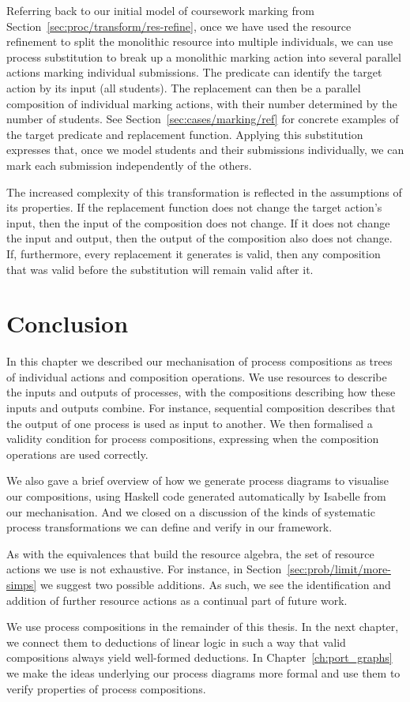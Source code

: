 \documentclass[class=smolathesis,crop=false]{standalone}
\begin{document}
Referring back to our initial model of coursework marking from Section~\ref{sec:proc/transform/res-refine}, once we have used the resource refinement to split the monolithic  resource into multiple individuals, we can use process substitution to break up a monolithic marking action into several parallel actions marking individual submissions.
The predicate can identify the target action by its input (all students).
The replacement can then be a parallel composition of individual marking actions, with their number determined by the number of students.
See Section~\ref{sec:cases/marking/ref} for concrete examples of the target predicate and replacement function.
Applying this substitution expresses that, once we model students and their submissions individually, we can mark each submission independently of the others.

The increased complexity of this transformation is reflected in the assumptions of its properties.
If the replacement function does not change the target action's input, then the input of the composition does not change.
If it does not change the input and output, then the output of the composition also does not change.
If, furthermore, every replacement it generates is valid, then any composition that was valid before the substitution will remain valid after it.

\section{Conclusion}
\label{sec:proc/conc}

In this chapter we described our mechanisation of process compositions as trees of individual actions and composition operations.
We use resources to describe the inputs and outputs of processes, with the compositions describing how these inputs and outputs combine.
For instance, sequential composition describes that the output of one process is used as input to another.
We then formalised a validity condition for process compositions, expressing when the composition operations are used correctly.

We also gave a brief overview of how we generate process diagrams to visualise our compositions, using Haskell code generated automatically by Isabelle from our mechanisation.
And we closed on a discussion of the kinds of systematic process transformations we can define and verify in our framework.

As with the equivalences that build the resource algebra, the set of resource actions we use is not exhaustive.
For instance, in Section~\ref{sec:prob/limit/more-simps} we suggest two possible additions.
As such, we see the identification and addition of further resource actions as a continual part of future work.

We use process compositions in the remainder of this thesis.
In the next chapter, we connect them to deductions of linear logic in such a way that valid compositions always yield well-formed deductions.
In Chapter~\ref{ch:port_graphs} we make the ideas underlying our process diagrams more formal and use them to verify properties of process compositions.

\ifstandalone


\fi
\end{document}
